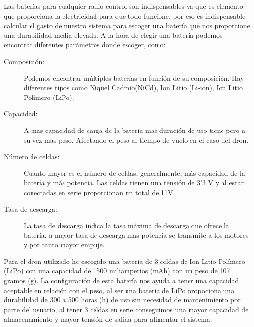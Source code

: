 
 Las baterías para cualquier radio control son indispensables ya que es elemento que proporciona la electricidad para que todo funcione, por eso es indispensable calcular el gasto de nuestro sistema para escoger una batería que nos proporcione una durabilidad media elevada.
 A la hora de elegir una batería podemos encontrar diferentes parámetros donde escoger, como:
 
 \begin{description}
 \item[Composición: ] Podemos encontrar múltiples baterías en función de su composición. Hay diferentes tipos como Niquel Cadmio(NiCd), Ion Litio (Li‑ion), Ion Litio Polímero (LiPo).
 \item[Capacidad: ] A mas capacidad de carga de la batería mas duración de uso tiene pero a su vez mas peso. Afectando el peso al tiempo de vuelo en el caso del dron.
 \item[Número de celdas: ] Cuanto mayor es el número de celdas, generalmente, más capacidad de la batería y más potencia. Las celdas tienen una tensión de 3'3 V y al estar conectadas en serie proporcionan un total de 11V.
 \item[Tasa de descarga: ] La tasa de descarga indica la tasa máxima de descarga que ofrece la batería, a mayor tasa de descarga mas potencia se transmite a los motores y por tanto mayor empuje. 
 \end{description}

Para el dron utilizado he escogido una batería de 3 celdas de Ion Litio Polímero (LiPo) con una capacidad de 1500 miliamperios (mAh) con un peso de 107 gramos (g). La configuración de esta batería nos ayuda a tener una capacidad aceptable en relación con el peso, al ser una batería de LiPo propociona una durabilidad de 300 a 500 horas (h) de uso sin necesidad de mantenimiento por parte del usuario, al tener 3 celdas en serie conseguimos una mayor capacidad de almacenamiento y mayor tensión de salida para alimentar el sistema.

